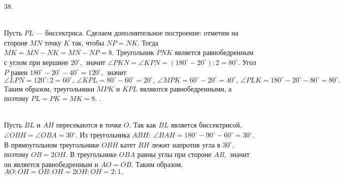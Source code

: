 38. \begin{figure}[ht!]
\end{figure}\\
Пусть $PL$ --- биссектриса. Сделаем дополнительное построение: отметим на стороне $MN$ точку $K$ так, чтобы $NP=NK.$ Тогда $MK=MN-NK=MN-NP=8.$ Треугольник $PNK$ является равнобедренным с углом при вершине $20^\circ,$ значит $\angle PKN=\angle KPN=(180^\circ-20^\circ):2=80^\circ.$ Угол $P$ равен $180^\circ-20^\circ-40^\circ=120^\circ,$ значит $\angle LPN=120^\circ:2=60^\circ,\ \angle KPL=80^\circ-60^\circ=20^\circ,\ \angle MPK=60^\circ-20^\circ=40^\circ,\ \angle PLK=180^\circ-20^\circ-80^\circ=80^\circ.$ Таким образом, треугольники $MPK$ и $KPL$ являются равнобедренными, а поэтому $PL=PK=MK=8.$\newpage
{}. \begin{figure}[ht!]
\end{figure}\\
Пусть $BL$ и $AH$ пересекаются в точке $O.$ Так как $BL$ является биссектрисой, $\angle OBH=\angle OBA=30^\circ.$ Из треугольника $ABH:\ \angle BAH=180^\circ-90^\circ-60^\circ=30^\circ.$ В прямоугольном треугольнике $OBH$ катет $BH$ лежит напротив угла в $30^\circ,$ поэтому $OB=2OH.$ В треугольнике $OBA$ равны углы при стороне $AB,$ значит он является равнобедренным и $AO=OB.$ Таким образом, $AO:OH=OB:OH=2OH:OH=2:1.$\\
